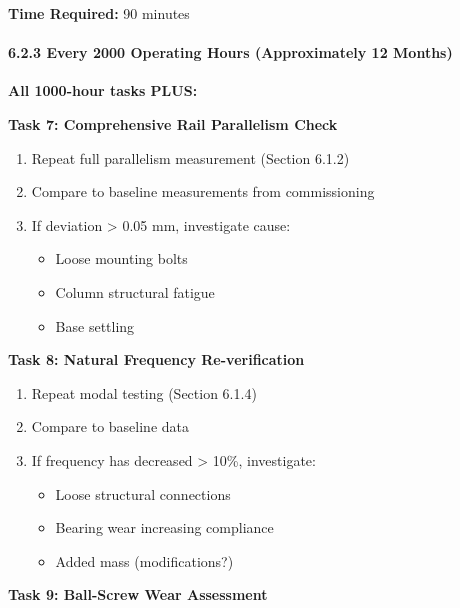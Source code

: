 \documentclass[
]{article}
\providecommand{\tightlist}{%
  \setlength{\itemsep}{0pt}\setlength{\parskip}{0pt}}
\begin{document}
\textbf{Time Required:} 90 minutes

\paragraph{6.2.3 Every 2000 Operating Hours (Approximately 12
Months)}\label{every-2000-operating-hours-approximately-12-months}

\textbf{All 1000-hour tasks PLUS:}

\textbf{Task 7: Comprehensive Rail Parallelism Check}

\begin{enumerate}
\def\labelenumi{\arabic{enumi}.}
\tightlist
\item
  Repeat full parallelism measurement (Section 6.1.2)
\item
  Compare to baseline measurements from commissioning
\item
  If deviation \textgreater{} 0.05 mm, investigate cause:

  \begin{itemize}
  \tightlist
  \item
    Loose mounting bolts
  \item
    Column structural fatigue
  \item
    Base settling
  \end{itemize}
\end{enumerate}

\textbf{Task 8: Natural Frequency Re-verification}

\begin{enumerate}
\def\labelenumi{\arabic{enumi}.}
\tightlist
\item
  Repeat modal testing (Section 6.1.4)
\item
  Compare to baseline data
\item
  If frequency has decreased \textgreater{} 10\%, investigate:

  \begin{itemize}
  \tightlist
  \item
    Loose structural connections
  \item
    Bearing wear increasing compliance
  \item
    Added mass (modifications?)
  \end{itemize}
\end{enumerate}

\textbf{Task 9: Ball-Screw Wear Assessment}
\end{document}
